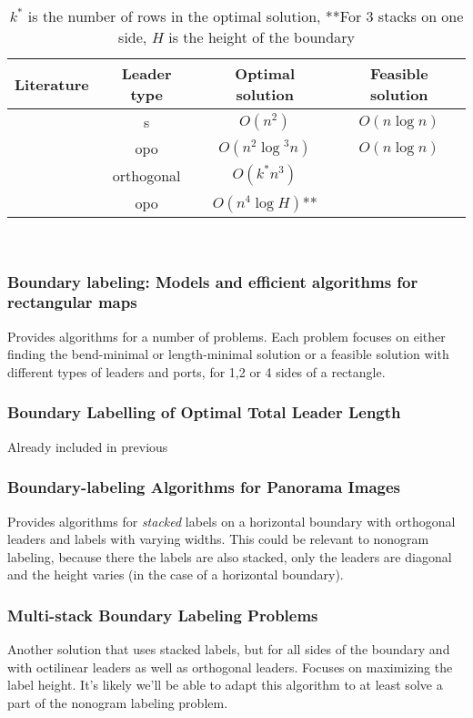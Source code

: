 \documentclass[a4paper]{article}
\begin{document}
\begin{table}[t]
\centering
\begin{tabular}{ |c|c|c|c| }
\hline
  Literature & Leader type &  Optimal solution & Feasible solution \\
\hline
  \cite{bekos2007boundary} & s & $O(n^2)$ & $O(n\log{}n)$ \\
 \cite{bekos2007boundary} & opo &  $O(n^2\log{^3}n)$ & $O(n\log{}n)$ \\
\cite{Gemsa:2011:BAP:2093973.2094012} & orthogonal & $O(k^*n^3)$& \\ 
\cite{bekos2006multi} & opo & $O(n^4 \log{}H)$**&\\
\hline
\end{tabular}\\
\caption{$k^*$ is the number of rows in the optimal solution, **For 3 stacks on one side, $H$ is the height of the boundary}
\label{tab:overview}
\end{table}


\subsubsection{Boundary labeling: Models and efficient algorithms for rectangular maps \cite{bekos2007boundary}}
Provides algorithms for a number of problems. Each problem focuses on either finding the bend-minimal or length-minimal solution or a feasible solution with different types of leaders and ports, for 1,2 or 4 sides of a rectangle.


\subsubsection{Boundary Labelling of Optimal Total Leader Length \cite{boundaryLabelling}}
Already included in previous\\

\subsubsection{Boundary-labeling Algorithms for Panorama Images \cite{Gemsa:2011:BAP:2093973.2094012}}
Provides algorithms for \emph{stacked} labels on a horizontal boundary with orthogonal leaders and labels with varying widths. This could be relevant to nonogram labeling, because there the labels are also stacked, only the leaders are diagonal and the height varies (in the case of a horizontal boundary).\\


\subsubsection{Multi-stack Boundary Labeling Problems \cite{bekos2006multi}}
Another solution that uses stacked labels, but for all sides of the boundary and with octilinear leaders as well as orthogonal leaders. Focuses on maximizing the label height. It's likely we'll be able to adapt this algorithm to at least solve a part of the nonogram labeling problem. 
\end{document}
